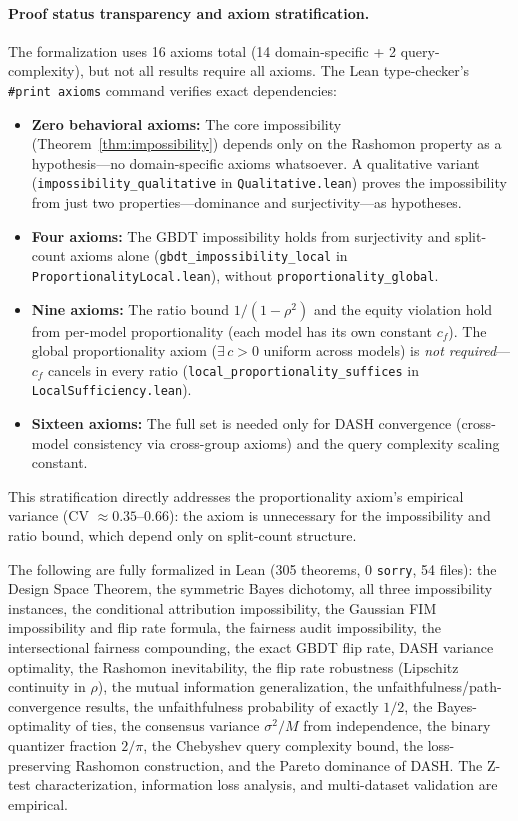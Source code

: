 \documentclass{jmlr}
\begin{document}
\paragraph{Proof status transparency and axiom stratification.}
The formalization uses 16 axioms total (14 domain-specific + 2 query-complexity), but not all results require all axioms. The Lean type-checker's \texttt{\#print axioms} command verifies exact dependencies:
\begin{itemize}
\item \textbf{Zero behavioral axioms:} The core impossibility (Theorem~\ref{thm:impossibility}) depends only on the Rashomon property as a hypothesis---no domain-specific axioms whatsoever. A qualitative variant (\texttt{impossibility\_qualitative} in \texttt{Qualitative.lean}) proves the impossibility from just two properties---dominance and surjectivity---as hypotheses.
\item \textbf{Four axioms:} The GBDT impossibility holds from surjectivity and split-count axioms alone (\texttt{gbdt\_impossibility\_local} in \texttt{ProportionalityLocal.lean}), without \texttt{proportionality\_global}.
\item \textbf{Nine axioms:} The ratio bound $1/(1{-}\rho^2)$ and the equity violation hold from per-model proportionality (each model has its own constant $c_f$). The global proportionality axiom ($\exists\, c > 0$ uniform across models) is \emph{not required}---$c_f$ cancels in every ratio (\texttt{local\_proportionality\_suffices} in \texttt{LocalSufficiency.lean}).
\item \textbf{Sixteen axioms:} The full set is needed only for DASH convergence (cross-model consistency via cross-group axioms) and the query complexity scaling constant.
\end{itemize}
This stratification directly addresses the proportionality axiom's empirical variance (CV $\approx 0.35$--$0.66$): the axiom is unnecessary for the impossibility and ratio bound, which depend only on split-count structure.

The following are fully formalized in Lean (305 theorems, 0 \texttt{sorry}, 54 files): the Design Space Theorem, the symmetric Bayes dichotomy, all three impossibility instances, the conditional attribution impossibility, the Gaussian FIM impossibility and flip rate formula, the fairness audit impossibility, the intersectional fairness compounding, the exact GBDT flip rate, DASH variance optimality, the Rashomon inevitability, the flip rate robustness (Lipschitz continuity in $\rho$), the mutual information generalization, the unfaithfulness/path-convergence results, the unfaithfulness probability of exactly $1/2$, the Bayes-optimality of ties, the consensus variance $\sigma^2/M$ from independence, the binary quantizer fraction $2/\pi$, the Chebyshev query complexity bound, the loss-preserving Rashomon construction, and the Pareto dominance of DASH. The Z-test characterization, information loss analysis, and multi-dataset validation are empirical.
\end{document}
